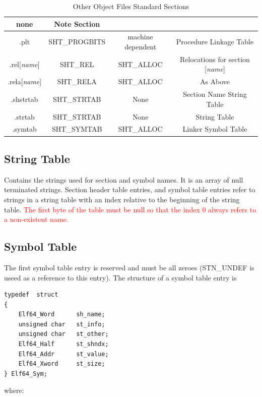 \begin{table}[!htbp]
\begin{center}
\begin{tabular}{|c|c|c|c|}
        {\ttfamily none} & Note Section\\ \hline {\ttfamily .plt} & {\ttfamily SHT\_PROGBITS} & {\ttfamily
        machine dependent} & Procedure Linkage Table\\ \hline {\ttfamily .rel[\textit{name}]} & {\ttfamily
        SHT\_REL} & {\ttfamily SHT\_ALLOC} & Relocations for section [\textit{name}]\\ \hline {\ttfamily
        .rela[\textit{name}]} & {\ttfamily SHT\_RELA} & {\ttfamily SHT\_ALLOC} & As Above \\ \hline {\ttfamily
        .shstrtab} & {\ttfamily SHT\_STRTAB} & {\ttfamily None} & Section Name String Table\\ \hline {\ttfamily
        .strtab} & {\ttfamily SHT\_STRTAB} & {\ttfamily None} & String Table\\ \hline {\ttfamily .symtab} &
    {\ttfamily SHT\_SYMTAB} & {\ttfamily SHT\_ALLOC} & Linker Symbol Table\\ \hline \end{tabular} \caption{Other
Object Files Standard Sections} \label{objfile} \end{center} \end{table} \subsection{String Table} Contains the
strings used for section and symbol names. It is an array of null terminated strings. Section header table
entries, and symbol table entries refer to strings in a string table with an index relative to the beginning of
the string table.  \textcolor{red}{The first byte of the table must be null so that the index 0 always refers to
a non-existent name.} \subsection{Symbol Table} The first symbol table entry is reserved and must be all zeroes
({\ttfamily STN\_UNDEF} is useed as a reference to this entry).  The structure of a symbol table entry is
\begin{lstlisting}[style=ansic, caption={Symbol Table Entry}, label=shdr]
typedef  struct
{
    Elf64_Word      sh_name;
    unsigned char 	st_info;
    unsigned char 	st_other;
    Elf64_Half 		st_shndx;
    Elf64_Addr      st_value;
    Elf64_Xword     st_size;
} Elf64_Sym;
\end{lstlisting} where: 
